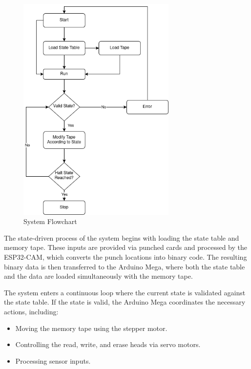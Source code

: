 \begin{figure}[h!]
    \centering
    \includegraphics[width=0.7\textwidth]{content/images/loopFlowchart.png}
    \caption{System Flowchart}
    \label{fig:flowchart}
\end{figure}

The state-driven process of the system begins with loading the state table and memory tape. These inputs are provided via punched cards and processed by the ESP32-CAM, which converts the punch locations into binary code. The resulting binary data is then transferred to the Arduino Mega, where both the state table and the data are loaded simultaneously with the memory tape.

The system enters a continuous loop where the current state is validated against the state table. If the state is valid, the Arduino Mega coordinates the necessary actions, including:

\begin{itemize}
    \item Moving the memory tape using the stepper motor.
    \item Controlling the read, write, and erase heads via servo motors.
    \item Processing sensor inputs.
\end{itemize}

